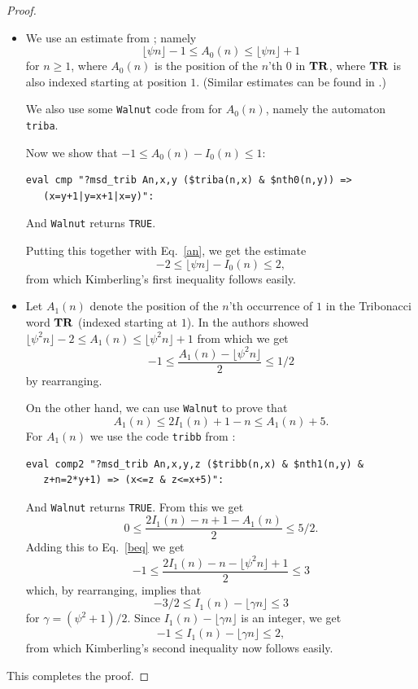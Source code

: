 \documentclass[
final
]{dmtcs-episciences}
\theoremstyle{plain}
\theoremstyle{definition}
\theoremstyle{remark}
\begin{document}
\begin{proof}
\leavevmode
\begin{itemize}
\item[(a)] We use an estimate from \cite[Eq.~(30)]{Dekking&Shallit&Sloane:2020}; namely
\begin{equation}
\lfloor \psi n \rfloor - 1 \leq A_0(n) \leq 
\lfloor \psi n \rfloor + 1 
\label{an}
\end{equation}
for $n \geq 1$, where $A_0(n)$ is the position of the $n$'th $0$
in $\bf TR$, where $\bf TR$ is also indexed starting at
position $1$.   (Similar estimates can be found in \cite{Richomme&Saari&Zamboni:2010}.)

We also use some {\tt Walnut} code from 
\cite{Shallit:2023} for $A_0(n)$, namely the 
automaton {\tt triba}.

Now we show that $-1 \leq A_0(n) - I_0(n) \leq 1$:
\begin{verbatim}
eval cmp "?msd_trib An,x,y ($triba(n,x) & $nth0(n,y)) =>
   (x=y+1|y=x+1|x=y)":
\end{verbatim}
And {\tt Walnut} returns {\tt TRUE}.

Putting this together with Eq.~\eqref{an}, we get the estimate
$$ -2 \leq \lfloor \psi n \rfloor - I_0(n) \leq 2,$$
from which Kimberling's first inequality follows easily.

\item[(b)]  Let $A_1(n)$ denote the position of the $n$'th occurrence of $1$ in the
Tribonacci word $\bf TR$ (indexed starting at $1$).  In
\cite[Eq.~(31)]{Dekking&Shallit&Sloane:2020} the authors showed
$ \lfloor \psi^2 n \rfloor - 2 \leq A_1(n) \leq \lfloor \psi^2 n \rfloor + 1$
from which we get
\begin{equation}
-1 \leq \frac{A_1(n) - \lfloor \psi^2 n \rfloor}{2} \leq 1/2
\label{beq}
\end{equation}
by
rearranging.

On the other hand, we can use {\tt Walnut} to prove that
$$A_1(n) \leq 2 I_1 (n) + 1-n \leq A_1(n) + 5.$$
For $A_1(n)$ we use the code {\tt tribb} from \cite[\S 10.12]{Shallit:2023}:
\begin{verbatim}
eval comp2 "?msd_trib An,x,y,z ($tribb(n,x) & $nth1(n,y) &
   z+n=2*y+1) => (x<=z & z<=x+5)":
\end{verbatim}
And {\tt Walnut} returns {\tt TRUE}.
From this we get
$$ 0 \leq \frac{2 I_1 (n) - n + 1 - A_1(n)}{2} \leq 5/2.$$
Adding this to Eq.~\eqref{beq}
we get
$$-1 \leq  \frac{2 I_1 (n) - n - \lfloor \psi^2 n \rfloor + 1}{2} \leq 3$$
which, by rearranging, implies that
$$ -3/2 \leq I_1 (n) - \lfloor \gamma n \rfloor \leq 3$$
for $\gamma = (\psi^2+1)/2$.  Since $I_1 (n) - \lfloor \gamma n \rfloor$
is an integer, we get
$$ -1 \leq I_1 (n) - \lfloor \gamma n \rfloor \leq 2,$$
from which
Kimberling's second inequality now follows easily.
\end{itemize}
This completes the proof.
\end{proof}
\end{document}
